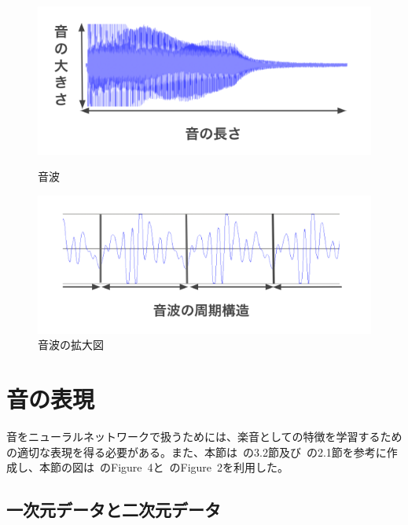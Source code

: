 \begin{figure}[b]
\centering
\begin{minipage}[b]{0.48\columnwidth}
\centering
\includegraphics[width=\columnwidth]{figure/gakuon1.png}
\caption{音波}
\label{fig:gakuon1}
\end{minipage}
\begin{minipage}[b]{0.48\columnwidth}
\centering
\includegraphics[width=\columnwidth]{figure/gakuon2.png}
\caption{音波の拡大図}
\label{fig:gakuon2}
\end{minipage}
\end{figure}

\clearpage

\section{音の表現}
\label{sec:expression}

音をニューラルネットワークで扱うためには、楽音としての特徴を学習するための適切な表現を得る必要がある。また、本節は~\cite{musictutorial}の3.2節及び~\cite{timbretron}の2.1節を参考に作成し、本節の図は~\cite{musictutorial}のFigure~4と~\cite{timbretron}のFigure~2を利用した。

\subsection{一次元データと二次元データ}

